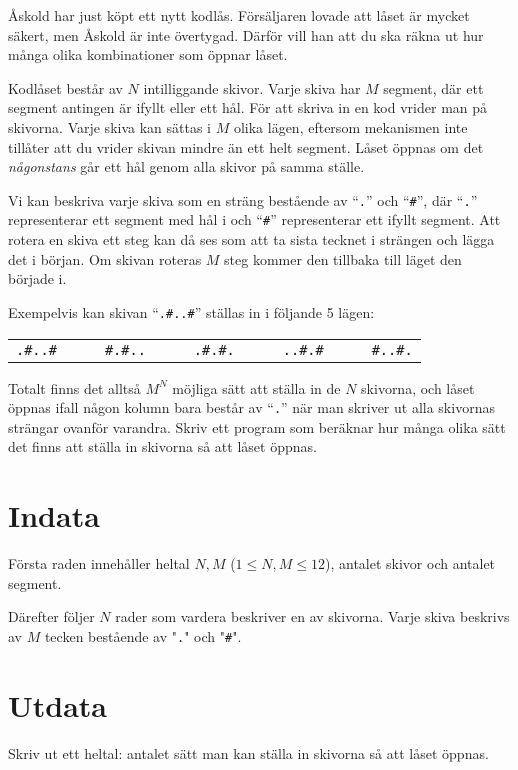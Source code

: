 Åskold har just köpt ett nytt kodlås.
Försäljaren lovade att låset är mycket säkert, men Åskold är inte övertygad.
Därför vill han att du ska räkna ut hur många olika kombinationer som öppnar låset.

Kodlåset består av $N$ intilliggande skivor.
Varje skiva har $M$ segment, där ett segment antingen är ifyllt eller ett hål.
För att skriva in en kod vrider man på skivorna.
Varje skiva kan sättas i $M$ olika lägen, eftersom mekanismen inte tillåter att du vrider skivan mindre än ett helt segment.
Låset öppnas om det \emph{någonstans} går ett hål genom alla skivor på samma ställe.

Vi kan beskriva varje skiva som en sträng bestående av ``\texttt{.}'' och ``\texttt{\#}'',
där ``\texttt{.}'' representerar ett segment med hål i och ``\texttt{\#}'' representerar ett ifyllt segment.
Att rotera en skiva ett steg kan då ses som att ta sista tecknet i strängen och lägga det i början.
Om skivan roteras $M$ steg kommer den tillbaka till läget den började i.

Exempelvis kan skivan ``\texttt{.\#..\#}'' ställas in i följande 5 lägen:

\begin{center}
  \begin{tabular}{l l|l l l|l l l|l l l|l l}
    \texttt{.\#..\#}&&& \texttt{\#.\#..}&&&\texttt{.\#.\#.}&&&\texttt{..\#.\#}&&&\texttt{\#..\#.}
  \end{tabular}
\end{center}

Totalt finns det alltså $M^N$ möjliga sätt att ställa in de $N$ skivorna, och låset öppnas ifall någon kolumn bara består av ``\texttt{.}'' 
när man skriver ut alla skivornas strängar ovanför varandra. Skriv ett program som beräknar hur många olika sätt det finns att ställa in skivorna så att låset öppnas.

\section*{Indata}
Första raden innehåller heltal $N, M$ ($1\le N, M \le 12$), antalet skivor och antalet segment.

Därefter följer $N$ rader som vardera beskriver en av skivorna.
Varje skiva beskrivs av $M$ tecken bestående av "\texttt{.}" och "\texttt{\#}".

\section*{Utdata}
Skriv ut ett heltal: antalet sätt man kan ställa in skivorna så att låset öppnas.

